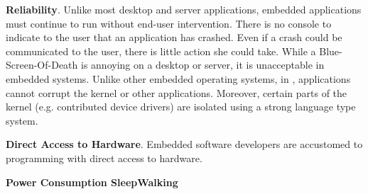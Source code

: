 {\bf Reliability}. Unlike most desktop and server applications, embedded
applications must continue to run without end-user intervention. There is no
console to indicate to the user that an application has crashed. Even if a crash
could be communicated to the user, there is little action she could take. While
a Blue-Screen-Of-Death is annoying on a desktop or server, it is unacceptable in
embedded systems. Unlike other embedded operating systems, in \name,
applications cannot corrupt the kernel or other applications. Moreover, certain
parts of the kernel (e.g. contributed device drivers) are isolated using
a strong language type system.

{\bf Direct Access to Hardware}. Embedded software developers are accustomed to
programming with direct access to hardware. 

{\bf Power Consumption SleepWalking}
